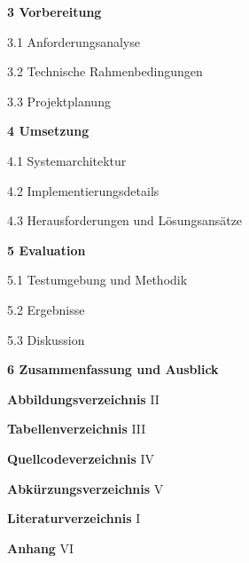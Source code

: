 \documentclass[a4paper,12pt,headsepline]{scrartcl}
\begin{document}
\vspace{0.5cm}
\noindent
\textbf{3 Vorbereitung} 

\noindent
\hspace{1cm} 3.1 Anforderungsanalyse 

\noindent
\hspace{1cm} 3.2 Technische Rahmenbedingungen 

\noindent
\hspace{1cm} 3.3 Projektplanung 

\vspace{0.5cm}
\noindent
\textbf{4 Umsetzung} 

\noindent
\hspace{1cm} 4.1 Systemarchitektur 

\noindent
\hspace{1cm} 4.2 Implementierungsdetails 

\noindent
\hspace{1cm} 4.3 Herausforderungen und Lösungsansätze 

\vspace{0.5cm}
\noindent
\textbf{5 Evaluation} 

\noindent
\hspace{1cm} 5.1 Testumgebung und Methodik 

\noindent
\hspace{1cm} 5.2 Ergebnisse 

\noindent
\hspace{1cm} 5.3 Diskussion 

\vspace{0.5cm}
\noindent
\textbf{6 Zusammenfassung und Ausblick} 

\vspace{0.8cm}
\noindent
\textbf{Abbildungsverzeichnis} \dotfill II

\noindent
\textbf{Tabellenverzeichnis} \dotfill III

\noindent
\textbf{Quellcodeverzeichnis} \dotfill IV

\noindent
\textbf{Abkürzungsverzeichnis} \dotfill V

\noindent
\textbf{Literaturverzeichnis} \dotfill I

\noindent
\textbf{Anhang} \dotfill VI

\newpage
\listoffigures
\end{document}

